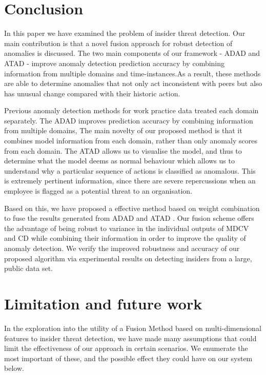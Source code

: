 \documentclass[conference]{IEEEtran}
\begin{document}
\section{Conclusion}

In this paper we have examined the problem of insider threat detection. Our main contribution is that a novel fusion approach for robust detection of anomalies is discussed. The two main components of our framework - ADAD and ATAD - improve anomaly detection prediction accuracy by combining information from multiple domains and time-instances.As a result, these methods are able to determine anomalies that not only act inconsistent with peers but also has unusual change compared with their historic action. 

Previous anomaly detection methods for work practice data treated each domain separately.  The ADAD improves prediction accuracy by combining information from multiple domains, The main novelty of our proposed method is that it combines model information from each domain, rather than only anomaly scores from each domain.  The ATAD allows us to visualise the model, and thus to determine what the model deems as normal behaviour which allows us to understand why a particular sequence of actions is classified as anomalous. This is extremely pertinent information, since there are severe repercussions when an employee is flagged as a potential threat to an organisation. 

Based on this, we have proposed a effective method based on weight combination to fuse the results generated from ADAD and ATAD . Our fusion scheme offers the advantage of being robust to variance in the individual outputs of MDCV and CD while combining their information in order to improve the quality of anomaly detection. We verify the improved robustness and accuracy of our proposed algorithm via experimental results on detecting insiders from a large, public data set.

\section{Limitation and future work}

In the exploration into the utility of a Fusion Method based on multi-dimensional features to insider threat detection, we have made many assumptions that could limit the effectiveness of our approach in certain scenarios. We enumerate the most important of these, and the possible effect they could have on our system below.
\end{document}
